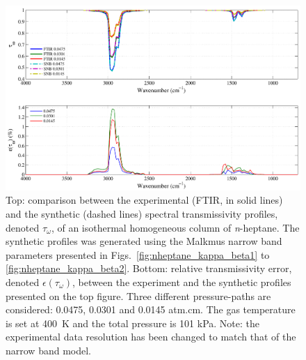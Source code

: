 \begin{figure}[p]
\includegraphics[width=\textwidth]{Figures/Comparison_Fit_Heptane_MALKMUS_Temp400K.pdf}
\caption{Top: comparison between the experimental (FTIR, in solid lines) and the synthetic (dashed lines) spectral transmissivity profiles, denoted $\tau_{\omega}$, of an isothermal homogeneous column of \textit{n}-heptane. The synthetic profiles was generated using the Malkmus narrow band parameters presented in Figs.~\ref{fig:nheptane_kappa_beta1} to \ref{fig:nheptane_kappa_beta2}. Bottom: relative transmissivity error, denoted $\epsilon{(\tau_{\omega})}$, between the experiment and the synthetic profiles presented on the top figure. Three different pressure-paths are considered: 0.0475, 0.0301 and 0.0145 atm.cm. The gas temperature is set at 400~K and the total pressure is 101 kPa. Note: the experimental data resolution has been changed to match that of the narrow band model. \label{fig:nheptane_SNBVerify_400K}}
\end{figure}

